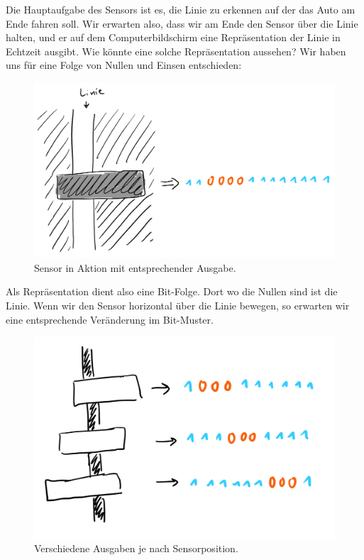 	
	Die Hauptaufgabe des Sensors ist es, die Linie zu erkennen auf der das Auto am Ende fahren soll. Wir erwarten also, dass wir am Ende den Sensor über die Linie halten, und er auf dem Computerbildschirm eine Repräsentation der Linie in Echtzeit ausgibt. Wie könnte eine solche Repräsentation aussehen? Wir haben uns für eine Folge von Nullen und Einsen entschieden:
	
	\begin{figure}[H]
		\centering
		\label{sensor2}
		\includegraphics[scale=0.5]{img/Sensor/Sensor2.png}
		\caption{Sensor in Aktion mit entsprechender Ausgabe.}
	\end{figure}

	
	 
	 Als Repräsentation dient also eine Bit-Folge. Dort wo die Nullen sind ist die Linie.
	 Wenn wir den Sensor horizontal über die Linie bewegen, so erwarten wir eine entsprechende Veränderung im Bit-Muster.
	 
	 \begin{figure}[H]
	 	\centering
	 	\label{sensor3}
	 	\includegraphics[scale=0.5]{img/Sensor/Sensor3.png}
	 	\caption{Verschiedene Ausgaben je nach Sensorposition.}
	 \end{figure}


